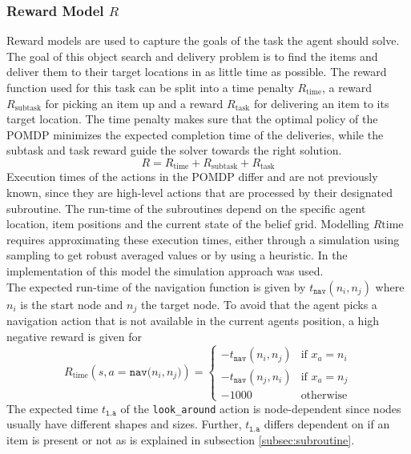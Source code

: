 \subsubsection{Reward Model $R$}
Reward models are used to capture the goals of the task the agent should solve. The goal of this object search and delivery problem is to find the items and deliver them to their target locations in as little time as possible. The reward function used for this task can be split into a time penalty $R_\text{time}$, a reward  $R_\text{subtask}$ for picking an item up and a reward $R_\text{task}$ for delivering an item to its target location. The time penalty makes sure that the optimal policy of the POMDP minimizes the expected completion time of the deliveries, while the subtask and task reward guide the solver towards the right solution. 
\begin{equation}
    R = R_{\text{time}} + R_{\text{subtask}} + R_{\text{task}} 
\end{equation}
Execution times of the actions in the POMDP differ and are not previously known, since they are high-level actions that are processed by their designated subroutine. The run-time of the subroutines depend on the specific agent location, item positions and the current state of the belief grid. Modelling $R\text{time}$ requires approximating these execution times, either through a simulation using sampling to get robust averaged values or by using a heuristic. In the implementation of this model the simulation approach was used.\\
The expected run-time of the navigation function is given by $t_\texttt{nav}(n_i, n_j)$ where $n_i$ is the start node and $n_j$ the target node. To avoid that the agent picks a navigation action that is not available in the current agents position, a high negative reward is given for 
\begin{equation}
    R_\text{time}(s, a=\texttt{nav($n_i, n_j$)}) = \begin{cases}
    -t_\texttt{nav}(n_i, n_j) & \text{if } x_a=n_i\\
    -t_\texttt{nav}(n_j, n_i) & \text{if } x_a=n_j\\
    -1000 & \text{otherwise}
    \end{cases}
\end{equation}
The expected time $t_\texttt{l.a}$ of the \texttt{look\_around} action is node-dependent since nodes usually have different shapes and sizes. Further, $t_\texttt{l.a}$ differs dependent on if an item is present or not as is explained in subsection \ref{subsec:subroutine}. 
